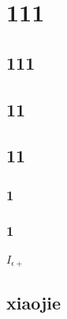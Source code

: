 \chapter{111}


\section{111}

\section{11}

\section{11}

\subsection{1}

\subsection{1}

\subsubsection{$I_{\epsilon+}$}


\section{xiaojie}




